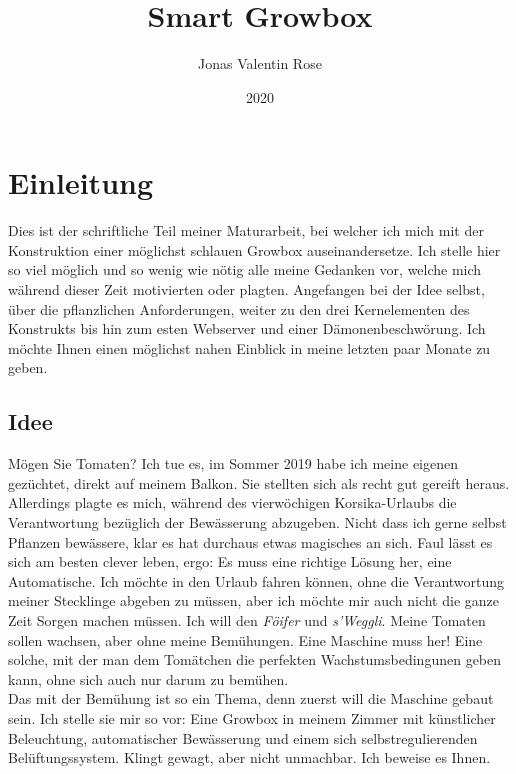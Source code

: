 \documentclass[12pt,titlepage,a4paper]{article}
\begin{document}
\begin{titlepage}
\title{Smart Growbox}
\date{2020}
\author{Jonas Valentin Rose}
\end{titlepage}
\maketitle 
\tableofcontents
\newpage
\section{Einleitung}
Dies ist der schriftliche Teil meiner Maturarbeit, bei welcher ich mich  mit der Konstruktion einer möglichst schlauen Growbox auseinandersetze. Ich stelle hier so viel möglich und so wenig wie nötig alle meine Gedanken vor, welche mich während dieser Zeit motivierten oder plagten. Angefangen bei der Idee selbst, über die pflanzlichen Anforderungen, weiter zu den drei Kernelementen des Konstrukts bis hin zum esten Webserver und einer Dämonenbeschwörung. Ich möchte Ihnen einen möglichst nahen Einblick in meine letzten paar Monate zu geben.


\subsection{Idee}
Mögen Sie Tomaten? Ich tue es, im Sommer 2019 habe ich meine eigenen gezüchtet, direkt auf meinem Balkon. Sie stellten sich als recht gut gereift heraus. Allerdings plagte es mich, während des vierwöchigen Korsika-Urlaubs die Verantwortung bezüglich der Bewässerung abzugeben. Nicht dass ich gerne selbst Pflanzen bewässere, klar es hat durchaus etwas magisches an sich. Faul lässt es sich am besten clever leben, ergo: Es muss eine richtige Lösung her, eine Automatische. Ich möchte in den Urlaub fahren können, ohne die Verantwortung meiner Stecklinge abgeben zu müssen, aber ich möchte mir auch nicht die ganze Zeit Sorgen machen müssen. Ich will den \textit{Föifer} und \textit{s'Weggli}. Meine Tomaten sollen wachsen, aber ohne meine Bemühungen. Eine Maschine muss her! Eine solche, mit der man dem Tomätchen die perfekten Wachstumsbedingunen geben kann, ohne sich auch nur darum zu bemühen. \\ Das mit der Bemühung ist so ein Thema, denn zuerst will die Maschine gebaut sein. Ich stelle sie mir so vor: Eine Growbox in meinem Zimmer mit künstlicher Beleuchtung, automatischer Bewässerung und einem sich selbstregulierenden Belüftungssystem. Klingt gewagt, aber nicht unmachbar. Ich beweise es Ihnen.
\end{document}
